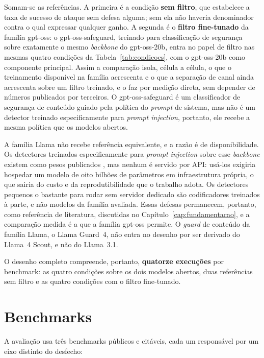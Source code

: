 Somam-se as referências. A primeira é a condição \textbf{sem filtro}, que
estabelece a taxa de sucesso de ataque sem defesa alguma; sem ela não haveria
denominador contra o qual expressar qualquer ganho. A segunda é o
\textbf{filtro fine-tunado} da família gpt-oss: o gpt-oss-safeguard, treinado
para classificação de segurança sobre exatamente o mesmo \textit{backbone} do
gpt-oss-20b, entra no papel de filtro nas mesmas quatro condições da
Tabela~\ref{tab:condicoes}, com o gpt-oss-20b como componente principal. Assim
a comparação isola, célula a célula, o que o treinamento disponível na família
acrescenta e o que a separação de canal ainda acrescenta sobre um filtro
treinado, e o faz por medição direta, sem depender de números publicados por
terceiros. O gpt-oss-safeguard é um classificador de segurança de conteúdo
guiado pela política do \textit{prompt} de sistema, mas não é um detector treinado
especificamente para \textit{prompt injection}, portanto, ele recebe a mesma política que
os modelos abertos.

A família Llama não recebe referência equivalente, e a razão é de
disponibilidade. Os detectores treinados especificamente para \textit{prompt
injection} sobre esse \textit{backbone} existem como pesos publicados
\cite{wang2025datafilter, geng2025pisanitizer, jacob2025promptshield}, mas
nenhum é servido por API: usá-los exigiria hospedar um modelo de oito bilhões
de parâmetros em infraestrutura própria, o que sairia do custo e da
reprodutibilidade que o trabalho adota. Os detectores pequenos o bastante para
rodar sem servidor dedicado são codificadores treinados à parte, e não modelos
da família avaliada. Essas defesas permanecem, portanto, como referência de
literatura, discutidas no Capítulo~\ref{cap:fundamentacao}, e a comparação
medida é a que a família gpt-oss permite. O \textit{guard} de conteúdo da
família Llama, o Llama Guard~4, não entra no desenho por ser derivado do
Llama~4 Scout, e não do Llama~3.1.

O desenho completo compreende, portanto, \textbf{quatorze execuções} por
benchmark: as quatro condições sobre os dois modelos abertos, duas referências
sem filtro e as quatro condições com o filtro fine-tunado.

\section{Benchmarks}\label{sec:benchmarks}

A avaliação usa três benchmarks públicos e citáveis, cada um responsável por um
eixo distinto do desfecho:

